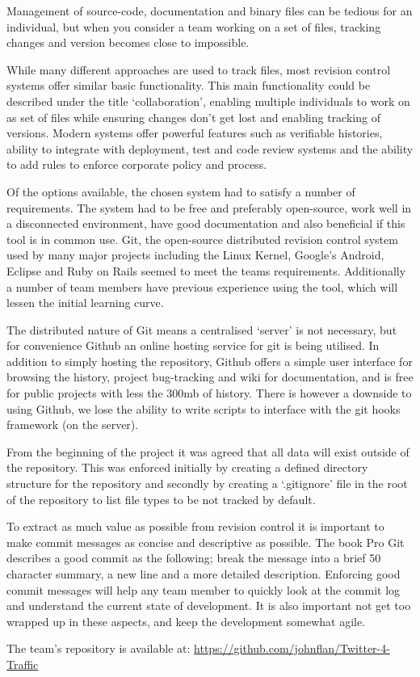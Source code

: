 Management of source-code, documentation and binary files can be tedious for an individual, but when you consider a team working on a set of files, tracking changes and version becomes close to impossible.

While many different approaches are used to track files, most revision control systems offer
similar basic functionality. This main functionality could be described under
the title ‘collaboration’, enabling multiple individuals to work on as set of
files while ensuring changes don’t get lost and enabling tracking of versions.
Modern systems offer powerful features such as verifiable histories, ability to integrate with deployment, test and code review systems and the ability to add rules to enforce corporate policy and process.

Of the options available, the chosen system had to satisfy a number of requirements. The system had to be free and preferably open-source, work well in a disconnected environment, have good documentation and also beneficial if this tool is in common use. Git\cite{website:git_scm}, the open-source distributed revision control system used by many major projects including the Linux Kernel, Google’s Android, Eclipse and Ruby on Rails seemed to meet the teams requirements. Additionally a number of team members have previous experience using the tool, which will lessen the initial learning curve.

The distributed nature of Git means a centralised ‘server’ is not necessary, but for convenience Github\cite{website:github} an online hosting service for git is being utilised. In addition to simply hosting the repository, Github offers a simple user interface for browsing the history, project bug-tracking and wiki for documentation, and is free for public projects with less the 300mb of history. There is however a downside to using Github, we lose the ability to write scripts to interface with the git hooks framework (on the server). 

From the beginning of the project it was agreed that all data will exist outside of the repository. This was enforced initially by creating a defined directory structure for the repository and secondly by creating a ‘.gitignore’ file in the root of the repository to list file types to be not tracked by default.  

To extract as much value as possible from revision control it is important to
make commit messages as concise and descriptive as possible. The book Pro
Git\cite{website:pro_git_ch2} describes a good commit as the following; break
the message into a brief 50 character summary, a new line and a more detailed
description. Enforcing good commit messages will help any team member to
quickly look at the commit log and understand the current state of development.
It is also important not get too wrapped up in these aspects, and keep the development somewhat agile.

The team’s repository is available at: \url{https://github.com/johnflan/Twitter-4-Traffic}
\pagebreak 

